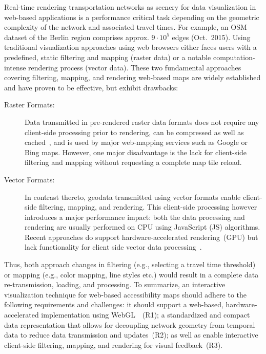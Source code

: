     Real-time rendering transportation networks as scenery for data visualization in
    web-based applications is a performance critical task depending on the geometric
    complexity of the network and associated travel times. For example, an OSM dataset
    of the Berlin region comprises approx. $9 \cdot 10^5$ edges (Oct.~2015). Using
    traditional visualization approaches using web browsers either faces users with
    a predefined, static filtering and mapping (raster data) or a notable computation-intense
    rendering process (vector data). These two fundamental approaches covering filtering,
    mapping, and rendering web-based maps are widely established and have proven to be
    effective, but exhibit drawbacks:

    \begin{description}
    \item[Raster Formats:]
    Data transmitted in pre-rendered raster data formats does not require any client-side
    processing prior to rendering, can be compressed as well as cached~\cite{ESRI2006}, and
    is used by major web-mapping services such as Google or Bing maps. However, one major
    disadvantage is the lack for client-side filtering and mapping without requesting a
    complete map tile reload.
    \item[Vector Formats:]
    In contrast thereto, geodata transmitted using vector formats  enable client-side
    filtering, mapping, and rendering. This client-side processing however introduces a
    major performance impact: both the data processing and rendering are usually performed
    on CPU using JavaScript (JS) algorithms. Recent approaches do support hardware-accelerated
    rendering~(GPU) but lack functionality for client side vector data processing~\cite{Gaffuri2012}.
    \end{description}

    \noindent Thus, both approach changes in filtering (e.g., selecting a travel time threshold)
    or mapping (e.g., color mapping, line styles etc.) would result in a complete data
    re-transmission, loading, and processing. To summarize, an interactive visualization
    technique for web-based accessibility maps should adhere to the following requirements
    and challenges: it should support a web-based, hardware-accelerated implementation
    using WebGL~\cite{Parisi2012}~(R1); a standardized and compact data representation that allows for decoupling
    network geometry from temporal data to reduce data transmission and updates~(R2);
    as well as enable interactive client-side filtering, mapping, and rendering for
    visual feedback~(R3).
